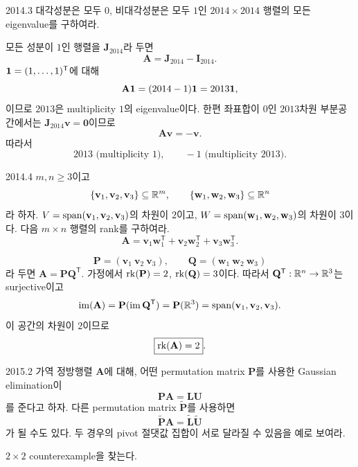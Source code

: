 \begin{pastproblem}{2014.3}
대각성분은 모두 $0$, 비대각성분은 모두 $1$인 $2014\times2014$ 행렬의 모든 eigenvalue를 구하여라.
\end{pastproblem}

\begin{solution}
모든 성분이 $1$인 행렬을 $\mathbf J_{2014}$라 두면
\[
\mathbf A=\mathbf J_{2014}-\mathbf I_{2014}.
\]
$\mathbf{1}=(1,\ldots,1)^{\mathsf T}$에 대해
\[
\mathbf A\mathbf{1}=(2014-1)\mathbf{1}=2013\mathbf{1},
\]
이므로 $2013$은 multiplicity $1$의 eigenvalue이다. 한편 좌표합이 $0$인 $2013$차원 부분공간에서는 $\mathbf J_{2014}\mathbf v=\mathbf0$이므로
\[
\mathbf A\mathbf v=-\mathbf v.
\]
따라서
\[
\boxed{2013\text{ (multiplicity }1),\qquad -1\text{ (multiplicity }2013)}.
\]
\end{solution}

\begin{pastproblem}{2014.4}
$m,n\ge3$이고
\[
\{\mathbf v_1,\mathbf v_2,\mathbf v_3\}\subseteq\mathbb{R}^m,
\qquad
\{\mathbf w_1,\mathbf w_2,\mathbf w_3\}\subseteq\mathbb{R}^n
\]
라 하자. $V=\operatorname{span}(\mathbf v_1,\mathbf v_2,\mathbf v_3)$의 차원이 $2$이고, $W=\operatorname{span}(\mathbf w_1,\mathbf w_2,\mathbf w_3)$의 차원이 $3$이다. 다음 $m\times n$ 행렬의 rank를 구하여라.
\[
\mathbf A=\mathbf v_1\mathbf w_1^{\mathsf T}+\mathbf v_2\mathbf w_2^{\mathsf T}+\mathbf v_3\mathbf w_3^{\mathsf T}.
\]
\end{pastproblem}

\begin{solution}
\[
\mathbf P=(\mathbf v_1\ \mathbf v_2\ \mathbf v_3),
\qquad
\mathbf Q=(\mathbf w_1\ \mathbf w_2\ \mathbf w_3)
\]
라 두면 $\mathbf A=\mathbf P\mathbf Q^{\mathsf T}$. 가정에서 $\operatorname{rk}(\mathbf P)=2$, $\operatorname{rk}(\mathbf Q)=3$이다. 따라서 $\mathbf Q^{\mathsf T}:\mathbb{R}^n\to\mathbb{R}^3$는 surjective이고
\[
\operatorname{im}(\mathbf A)
=\mathbf P(\operatorname{im}\mathbf Q^{\mathsf T})
=\mathbf P(\mathbb{R}^3)
=\operatorname{span}(\mathbf v_1,\mathbf v_2,\mathbf v_3).
\]
이 공간의 차원이 $2$이므로
\[
\boxed{\operatorname{rk}(\mathbf A)=2}.
\]
\end{solution}

\begin{pastproblem}{2015.2}
가역 정방행렬 $\mathbf A$에 대해, 어떤 permutation matrix $\mathbf P$를 사용한 Gaussian elimination이
\[
\mathbf P\mathbf A=\mathbf L\mathbf U
\]
를 준다고 하자. 다른 permutation matrix $\widetilde{\mathbf P}$를 사용하면
\[
\widetilde{\mathbf P}\mathbf A=\widetilde{\mathbf L}\widetilde{\mathbf U}
\]
가 될 수도 있다. 두 경우의 pivot 절댓값 집합이 서로 달라질 수 있음을 예로 보여라.
\begin{hint}
$2\times2$ counterexample을 찾는다.
\end{hint}
\end{pastproblem}

